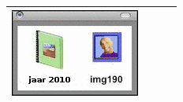 \documentclass[12pt, a4paper]{article}
\begin{document}
\begin{minipage}{\textwidth}
\begin{table}[H]
\begin{tabulary}{\linewidth}{|C|C|C|C|}
					\includegraphics[width=\linewidth]{option4} \\
					\hline 
				\end{tabulary}
			\end{table}
	\end{minipage} \\ \\
	
\end{document}

